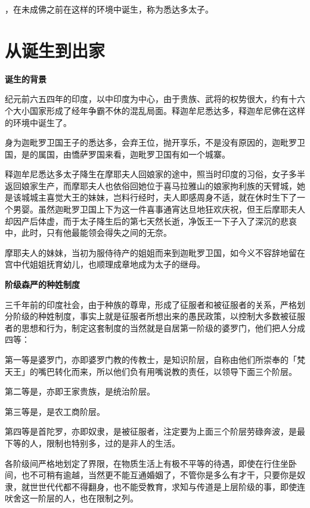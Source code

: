 \documentclass[twoside,openany]{book}
\newcommand{\mt}[1]{\textbullet \textbf{#1}}
\begin{document}
，在未成佛之前在这样的环境中诞生，称为悉达多太子。
	
\newpage
\section{从诞生到出家}\label{sec1.1}

\mt{诞生的背景}

纪元前六五四年的印度，以中印度为中心，由于贵族、武将的权势很大，约有十六个大小国家形成了经年争霸不休的混乱局面。释迦牟尼\textperiodcentered 悉达多，释迦牟尼佛在这样的环境中诞生了。

身为迦毗罗卫国王子的悉达多，会弃王位，抛开享乐，不是没有原因的，迦毗罗卫国，是的属国，由憍萨罗国来看，迦毗罗卫国有如一个城寨。

释迦牟尼\textperiodcentered 悉达多太子降生在摩耶夫人回娘家的途中，照当时印度的习俗，女子多半返回娘家生产，而摩耶夫人也依俗回她位于喜马拉雅山的娘家拘利族的天臂城，她是该城城主喜觉大王的妹妹，岂料行经时，夫人即感周身不适，就在休时生下了一个男婴。虽然迦毗罗卫国上下为这一件喜事通宵达旦地狂欢庆祝，但王后摩耶夫人却因产后体虚，而于太子降生后的第七天然长逝，净饭王一下子入了深沉的悲哀中，此时，只有他最能领会得失之间的无奈。

摩耶夫人的妹妹，当初为服侍待产的姐姐而来到迦毗罗卫国，如今义不容辞地留在宫中代姐姐抚育幼儿，也顺理成章地成为太子的继母。

\mt{阶级森严的种姓制度}

三千年前的印度社会，由于种族的尊卑，形成了征服者和被征服者的关系，严格划分阶级的种姓制度，事实上就是征服者所想出来的愚民政策，以控制大多数被征服者的思想和行为，制定这套制度的当然就是自居第一阶级的婆罗门，他们把人分成四等：

第一等是婆罗门，亦即婆罗门教的传教士，是知识阶层，自称由他们所崇奉的「梵天王」的嘴巴转化而来，所以他们负有用嘴说教的责任，以领导下面三个阶层。

第二等是，亦即王家贵族，是统治阶层。

第三等是，是农工商阶层。

第四等是首陀罗，亦即奴隶，是被征服者，注定要为上面三个阶层劳碌奔波，是最下等的人，限制也特别多，过的是非人的生活。

各阶级间严格地划定了界限，在物质生活上有极不平等的待遇，即使在行住坐卧间，也不可稍有逾越，当然更不能互通婚姻了，不管你是多么有才干，只要你是奴隶，就世世代代都不得翻身，也不能受教育，求知与传道是上层阶级的事，即使连吠舍这一阶层的人，也在限制之列。
\end{document}
